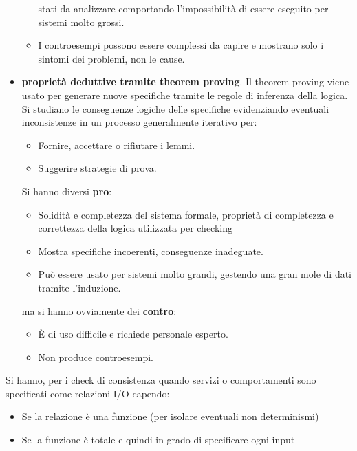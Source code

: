 \begin{itemize}
\begin{itemize}
                        stati da analizzare comportando l'impossibilità di essere
                        eseguito per sistemi molto grossi.
                  \item I controesempi possono essere complessi da capire e
                        mostrano solo i sintomi dei problemi, non le cause.
            \end{itemize}
      \item \textbf{proprietà deduttive tramite theorem proving}. Il theorem proving viene
            usato per generare nuove specifiche tramite le regole di inferenza
            della logica. Si studiano le conseguenze logiche delle specifiche
            evidenziando eventuali inconsistenze in un processo generalmente
            iterativo per:
            \begin{itemize}
                  \item Fornire, accettare o rifiutare i lemmi.
                  \item Suggerire strategie di prova.
            \end{itemize}
            Si hanno diversi \textbf{pro}:
            \begin{itemize}
                  \item Solidità e completezza del sistema formale, proprietà di 
                        completezza e correttezza della logica utilizzata per 
                        checking
                  \item Mostra specifiche incoerenti, conseguenze inadeguate.
                  \item Può essere usato per sistemi molto grandi, gestendo una
                        gran mole di dati tramite l'induzione.
            \end{itemize}
            ma si hanno ovviamente dei \textbf{contro}:
            \begin{itemize}
                  \item È di uso difficile e richiede personale esperto.
                  \item Non produce controesempi.
            \end{itemize}
\end{itemize}
Si hanno, per i check di consistenza quando servizi o comportamenti sono
specificati come relazioni I/O capendo:
\begin{itemize}
      \item Se la relazione è una funzione (per isolare eventuali non determinismi)
      \item Se la funzione è totale e quindi in grado di specificare ogni input
\end{itemize}
